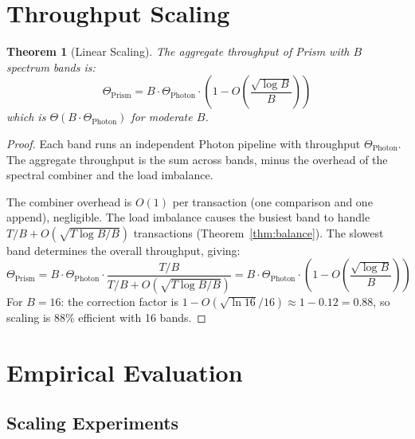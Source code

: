 \documentclass[11pt,a4paper]{article}
\newtheorem{theorem}{Theorem}[section]
\begin{document}
\section{Throughput Scaling}
\label{sec:throughput}

\begin{theorem}[Linear Scaling]
\label{thm:scaling}
The aggregate throughput of Prism with $B$ spectrum bands is:
\[
\Theta_{\text{Prism}} = B \cdot \Theta_{\text{Photon}} \cdot \left(1 - O\left(\frac{\sqrt{\log B}}{B}\right)\right)
\]
which is $\Theta(B \cdot \Theta_{\text{Photon}})$ for moderate $B$.
\end{theorem}

\begin{proof}
Each band runs an independent Photon pipeline with throughput $\Theta_{\text{Photon}}$.
The aggregate throughput is the sum across bands, minus the overhead of the spectral
combiner and the load imbalance.

The combiner overhead is $O(1)$ per transaction (one comparison and one append), negligible.
The load imbalance causes the busiest band to handle $T/B + O(\sqrt{T\log B / B})$
transactions (Theorem~\ref{thm:balance}). The slowest band determines the overall
throughput, giving:
\[
\Theta_{\text{Prism}} = B \cdot \Theta_{\text{Photon}} \cdot \frac{T/B}{T/B + O(\sqrt{T\log B/B})}
= B \cdot \Theta_{\text{Photon}} \cdot \left(1 - O\left(\frac{\sqrt{\log B}}{B}\right)\right)
\]
For $B = 16$: the correction factor is $1 - O(\sqrt{\ln 16}/16) \approx 1 - 0.12 = 0.88$,
so scaling is 88\% efficient with 16 bands.
\end{proof}

\section{Empirical Evaluation}
\label{sec:evaluation}

\subsection{Scaling Experiments}
\end{document}
